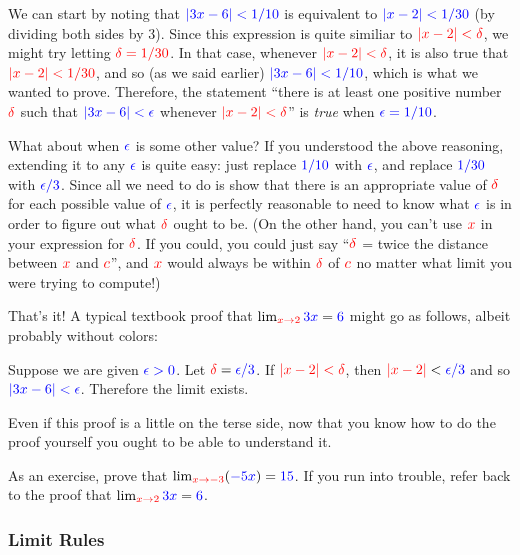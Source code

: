 \documentclass{myarticle}
\newcommand{\hor}[1]{\textcolor{red}{#1}} %
\newcommand{\ver}[1]{\textcolor{blue}{#1}}
\theoremstyle{nospace}
\newtheorem{old series theorem}{Theorem}
\newenvironment{series theorem}{\begin{mdframed}\begin{old series theorem}}{\end{old series theorem}\end{mdframed}}
\begin{document}
We can start by noting that $\ver{|3x - 6| < 1/10}$ is equivalent to $\ver{|x - 2| < 1/30}$ (by dividing both sides by 3). Since this expression is quite similiar to $\hor{|x - 2| < \delta}$, we might try letting $\hor{\delta = 1/30}$. In that case, whenever $\hor{|x - 2| < \delta}$, it is also true that $\hor{|x - 2| < 1/30}$, and so (as we said earlier) $\ver{|3x - 6| < 1/10}$, which is what we wanted to prove. Therefore, the statement ``there is at least one positive number $\hor{\delta}$ such that $\ver{|3x - 6| < \epsilon}$ whenever $\hor{|x - 2| < \delta}$'' is \emph{true} when $\ver{\epsilon = 1/10}$.

What about when $\ver{\epsilon}$ is some other value? If you understood the above reasoning, extending it to any $\ver{\epsilon}$ is quite easy: just replace $\ver{1/10}$ with $\ver{\epsilon}$, and replace $\ver{1/30}$ with $\ver{\epsilon/3}$. Since all we need to do is show that there is an appropriate value of $\hor{\delta}$ for each possible value of $\ver{\epsilon}$, it is perfectly reasonable to need to know what $\ver{\epsilon}$ is in order to figure out what $\hor{\delta}$ ought to be. (On the other hand, you can't use $\hor{x}$ in your expression for $\hor{\delta}$. If you could, you could just say ``$\hor{\delta}$ = twice the distance between $\hor{x}$ and $\hor{c}$'', and $\hor{x}$ would always be within $\hor{\delta}$ of $\hor{c}$ no matter what limit you were trying to compute!)

That's it! A typical textbook proof that $\lim_{\hor{x \to 2}} \ver{3x} = \ver{6}$ might go as follows, albeit probably without colors:

\begin{mdframed} Suppose we are given $\ver{\epsilon > 0}$. Let $\hor{\delta} = \ver{\epsilon/3}$. If $\hor{|x - 2| < \delta}$, then $\hor{|x - 2|} < \ver{\epsilon/3}$ and so $\ver{|3x - 6| < \epsilon}$. Therefore the limit exists. \end{mdframed}

Even if this proof is a little on the terse side, now that you know how to do the proof yourself you ought to be able to understand it.

As an exercise, prove that $\lim_{\hor{x \to -3}} (\ver{-5x}) = \ver{15}$. If you run into trouble, refer back to the proof that $\lim_{\hor{x \to 2}} \ver{3x} = \ver{6}$.

\subsubsection{Limit Rules} \label{sec:limit rules}
\end{document}

